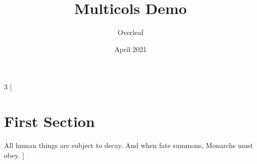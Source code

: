 \documentclass{article}
\title{Multicols Demo}
\author{Overleaf}
\date{April 2021}
\begin{document}
	\maketitle
	
	\begin{multicols}{3}
		[
		\section{First Section}
		All human things are subject to decay. And when fate summons, Monarchs must obey.
		]
		\blindtext\blindtext
	\end{multicols}
	
\end{document}
